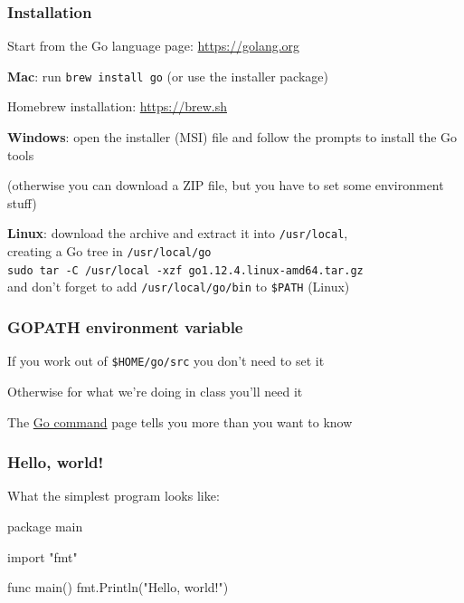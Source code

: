 \documentclass[handout,compress,t,11pt]{beamer}
\begin{document}
\begin{frame}[fragile]
    \frametitle{Installation}
    Start from the Go language page: \href{https://golang.org}{https://golang.org} \par
    \vspace{0.5\baselineskip}
    {\bf Mac}: run \verb|brew install go| (or use the installer package) \par
    {\scriptsize Homebrew installation: \href{https://brew.sh}{https://brew.sh}} \par
    \vspace{0.75\baselineskip}
    {\bf Windows}: open the installer (MSI) file and follow the prompts to install the Go tools \par
    {\scriptsize(otherwise you can download a ZIP file, but you have to set some environment stuff)} \par
    \vspace{0.75\baselineskip}
    {\bf Linux}: download the archive and extract it into \verb|/usr/local|, \\
    creating a Go tree in \verb|/usr/local/go| \\
    \vspace{0.5\baselineskip}
    {\scriptsize\verb|sudo tar -C /usr/local -xzf go1.12.4.linux-amd64.tar.gz|} \\
    \vspace{0.5\baselineskip}
    and don't forget to add \verb|/usr/local/go/bin| to \verb|$PATH| (Linux)\\
\end{frame}

\begin{frame}[fragile]
    \frametitle{GOPATH environment variable}
    If you work out of \verb|$HOME/go/src| you don't need to set it \par
    \vspace{0.5\baselineskip}
    Otherwise for what we're doing in class you'll need it \par
    \vspace{2\baselineskip}    
    The \href{https://golang.org/cmd/go/}{Go command} page tells you more than you want to know
\end{frame}

\begin{frame}[fragile]
\frametitle{Hello, world!}
What the simplest program looks like:
\begin{golang}
package main

import "fmt"

func main() {
    fmt.Println("Hello, world!")
}
\end{golang}
\end{frame}
\end{document}
